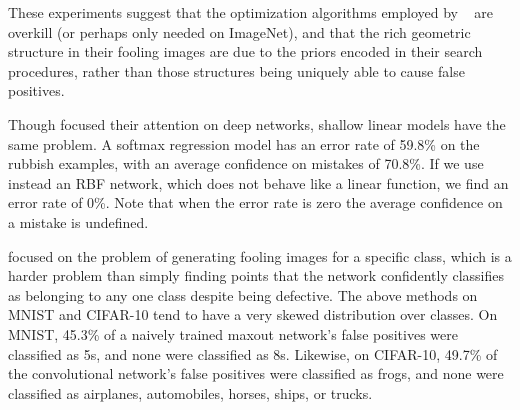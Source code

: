 \documentclass{article} %
\begin{document}
These experiments suggest that the optimization algorithms employed by ~\citet{fool}
are overkill (or perhaps only needed on ImageNet), and that the rich geometric structure in
their fooling images are due to the priors encoded
in their search procedures, rather than those structures being uniquely able to cause false positives.

Though \citet{fool} focused their attention on deep networks, shallow linear models have the same problem.
A softmax regression model has an error rate of 59.8\%
on the rubbish examples, with an average confidence on mistakes of 70.8\%.
If we use instead an RBF network, which does not behave like a linear function,
we find an error rate of 0\%. Note that when the error rate is zero the average confidence on a mistake
is undefined.

\citet{fool} focused on the problem of generating fooling images for a specific class,
which is a harder problem than simply finding points that the network confidently classifies
as belonging to any one class despite being defective.
The above methods on MNIST and CIFAR-10 tend to have a very skewed distribution over classes.
On MNIST, 45.3\% of a naively trained maxout network's false positives were classified as 5s,
and none were classified as 8s. Likewise, on CIFAR-10, 49.7\% of the convolutional network's
false positives were classified as frogs, and none 
were classified as airplanes, automobiles, horses, ships, or trucks.
\end{document}
